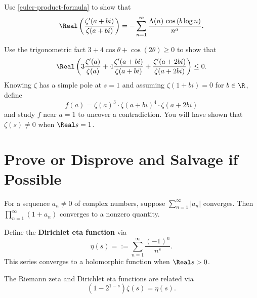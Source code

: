 \documentclass{homework}
\begin{document}
\begin{problem}
  Use \ref{euler-product-formula} to show that
  \[
    \Real \left( \frac{ \zeta'(a+bi) }{ \zeta(a+bi) } \right) = - \sum_{n=1}^\infty \frac{\Lambda(n) \, \cos \left( b \log n \right)}{n^{a}}.
  \]
\end{problem}

\begin{problem}
  Use the trigonometric fact $3 + 4 \cos \theta + \cos (2\theta) \geq 0$ to show that
  \[
    \Real \left( 3 \frac{ \zeta'(a) }{ \zeta(a) } + 4 \frac{ \zeta'(a+bi) }{ \zeta(a+bi) } +  \frac{ \zeta'(a+2bi) }{ \zeta(a+2bi) } \right) \leq 0.
  \]
  Knowing $\zeta$ has a simple pole at $s = 1$ and assuming
  $\zeta(1+bi) = 0$ for $b \in \R$, define 
  \[
    f(a) = \zeta(a)^3 \cdot \zeta(a+bi)^4 \cdot \zeta(a + 2bi)
  \]
  and study $f$ near $a = 1$ to uncover a contradiction.  You will
  have shown that $\zeta(s) \neq 0$ when $\Real s = 1$.
\end{problem}

\section{Prove or Disprove and Salvage if Possible}

\begin{problem}\label{nonzero-infinite-product}For a sequence $a_n \neq 0$ of complex numbers, suppose
  $\displaystyle\sum_{n=1}^\infty |a_n|$ converges.  Then
  $\displaystyle\prod_{n=1}^\infty \left( 1 + a_n \right)$ converges
  to a nonzero quantity.
\end{problem}

\begin{problem} %
  Define the \textbf{Dirichlet eta function} via
  \[
    \eta(s) = := \sum_{n=1}^\infty \frac{(-1)^n}{n^s}.
  \]
  This series converges to a holomorphic function when $\Real s > 0$.
\end{problem}

\begin{problem}
  The Riemann zeta and Dirichlet eta functions are related via
  \[
    \left( 1 - 2^{1-s} \right) \zeta(s) = \eta(s).
  \]
\end{problem}
\end{document}
